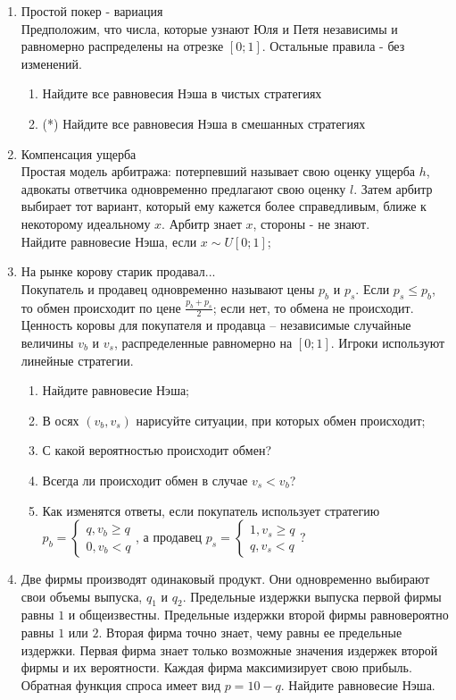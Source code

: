 \documentclass[pdftex,12pt,a4paper]{article}
\begin{document}
\begin{enumerate}
\item Простой покер - вариация \\
Предположим, что числа, которые узнают Юля и Петя независимы и равномерно распределены на отрезке $[0;1]$. Остальные правила - без изменений. 
\begin{enumerate}
\item Найдите все равновесия Нэша в чистых стратегиях
\item (*) Найдите все равновесия Нэша в смешанных стратегиях
\end{enumerate}

\item Компенсация ущерба \\
Простая модель арбитража: потерпевший называет свою оценку ущерба $h$, адвокаты ответчика одновременно предлагают свою оценку $l$. Затем арбитр выбирает тот вариант, который ему кажется более справедливым, ближе к некоторому идеальному $x$. Арбитр знает $x$, стороны - не знают.\\ Найдите равновесие Нэша, если $x \sim U\left[ {0;1} \right]$;

\item На рынке корову старик продавал... \\
Покупатель и продавец одновременно называют цены $p_b $ и $p_s $. Если $p_s  \le p_b $, то обмен происходит по цене $\frac{{p_b  + p_s }}{2}$; если нет, то обмена не происходит. Ценность коровы для покупателя и продавца – независимые случайные величины $v_b $ и $v_s $, распределенные равномерно на $\left[ {0;1} \right]$. Игроки используют линейные стратегии.
\begin{enumerate}
\item Найдите равновесие Нэша; 
\item В осях $(v_{b},v_{s})$ нарисуйте ситуации, при которых обмен происходит; 
\item С какой вероятностью происходит обмен? 
\item Всегда ли происходит обмен в случае $v_s  < v_b $? 
\item Как изменятся ответы, если покупатель использует стратегию $p_b=\left\{\begin{array}{l}q, v_b\ge q \\ 0, v_b<q \end{array}\right.$, а продавец $p_s=\left\{\begin{array}{l}1, v_s\ge q \\ q, v_s<q \end{array}\right.$?
\end{enumerate}

\item Две фирмы производят одинаковый продукт. Они одновременно выбирают свои объемы выпуска, $q_1$ и $q_2$. Предельные издержки выпуска первой фирмы равны $1$ и общеизвестны. Предельные издержки второй фирмы равновероятно равны $1$ или $2$. Вторая фирма точно знает, чему равны ее предельные издержки. Первая фирма знает только возможные значения издержек второй фирмы и их вероятности. Каждая фирма максимизирует свою прибыль. Обратная функция спроса имеет вид $p=10-q$. Найдите равновесие Нэша.

\end{enumerate}
\end{document}
